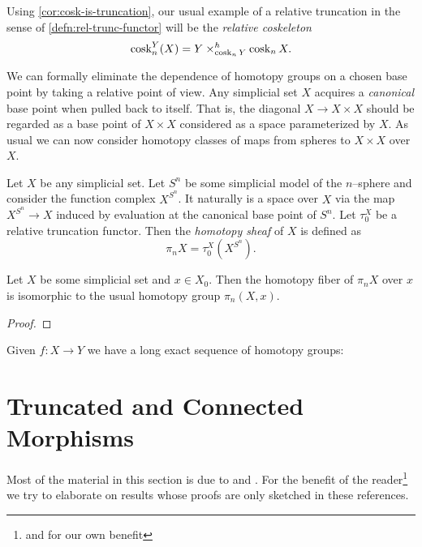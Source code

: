 \begin{example}
  Using \autoref{cor:cosk-is-truncation}, our usual example of a
  relative truncation in the sense of \autoref{defn:rel-trunc-functor}
  will be the \emph{relative coskeleton}
  \[
    \operatorname{\textnormal{cosk}}_n^Y(X) = Y\times^h_{\operatorname{\textnormal{cosk}}_n Y}\operatorname{\textnormal{cosk}}_nX.
  \]
\end{example}

We can formally eliminate the dependence of homotopy groups on a chosen
base point by taking a relative point of view. Any simplicial set \(X\)
acquires a \emph{canonical} base point when pulled back to itself. That
is, the diagonal \(X\to X\times X\) should be regarded as a base point
of \(X\times X\) considered as a space parameterized by \(X\). As
usual we can now consider homotopy classes of maps from spheres to
\(X\times X\) over \(X\).

\begin{definition}\label{defn:homotopy-sheaf}
  Let \(X\) be any simplicial set. Let \(S^{n}\) be some simplicial
  model of the \(n\)--sphere and consider the function complex
  \(X^{S^n}\). It naturally is a space over \(X\) via the map
  \(X^{S^n}\to X\) induced by evaluation at the canonical base point of
  \(S^n\). Let \(\tau_0^X\) be a relative  truncation functor.
  Then the \emph{ homotopy sheaf} of \(X\) is defined as
  \[
    \pi_nX = \tau_0^{X}(X^{S^n}).
  \]
\end{definition}

\begin{proposition}
  Let \(X\) be some simplicial set and \(x\in X_{0}\). Then the
  homotopy fiber of \(\pi_nX\) over \(x\) is isomorphic to the usual
  homotopy group \(\pi_n(X,x)\).
\end{proposition}
\begin{proof}
\end{proof}

\begin{proposition}
  Given \(f\colon X\to Y\) we have a long exact sequence of homotopy groups:
\end{proposition}


\section{Truncated and Connected Morphisms}
Most of the material in this section is due to \cite{mr2522659} and
\cite{rezkhomotopytoposes}. For the benefit of the reader\footnote{and
  for our own benefit} we try to elaborate on results whose proofs are
only sketched in these references.

